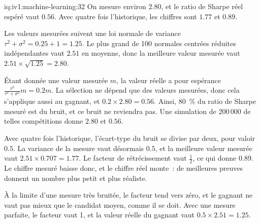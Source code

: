 \begin{solution}{iq:iv1:machine-learning:32}
On mesure environ $2.80$, et le ratio de Sharpe réel espéré vaut $0.56$. Avec quatre fois l'historique, les chiffres sont $1.77$ et $0.89$.

Les valeurs mesurées suivent une loi normale de variance $\tau^2 + \sigma^2 = 0.25 + 1 = 1.25$. Le plus grand de 100 normales centrées réduites indépendantes vaut $2.51$ en moyenne, donc la meilleure valeur mesurée vaut $2.51 \times \sqrt{1.25} = 2.80$.

Étant donnée une valeur mesurée $m$, la valeur réelle a pour espérance $\frac{\tau^2}{\tau^2 + \sigma^2}m = 0.2m$. La sélection ne dépend que des valeurs mesurées, donc cela s'applique aussi au gagnant, et $0.2 \times 2.80 = 0.56$. Ainsi, 80~\% du ratio de Sharpe mesuré est du bruit, et ce bruit ne reviendra pas. Une simulation de 200\,000 de telles compétitions donne $2.80$ et $0.56$.

Avec quatre fois l'historique, l'écart-type du bruit se divise par deux, pour valoir $0.5$. La variance de la mesure vaut désormais $0.5$, et la meilleure valeur mesurée vaut $2.51 \times 0.707 = 1.77$. Le facteur de rétrécissement vaut $\frac12$, ce qui donne $0.89$. Le chiffre mesuré baisse donc, et le chiffre réel monte~: de meilleures preuves donnent un nombre plus petit et plus réaliste.

À la limite d'une mesure très bruitée, le facteur tend vers zéro, et le gagnant ne vaut pas mieux que le candidat moyen, comme il se doit. Avec une mesure parfaite, le facteur vaut 1, et la valeur réelle du gagnant vaut $0.5 \times 2.51 = 1.25$.



\end{solution}

